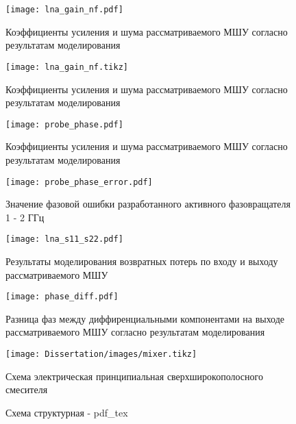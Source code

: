 \begin{figure}[ht]
	\centering
	\texttt{[image: lna\_gain\_nf.pdf]}
	
	\caption{Коэффициенты усиления и шума рассматриваемого МШУ согласно результатам моделирования}
	\label{ct:lna_gain_nf}
\end{figure}

\begin{figure}[ht]
	\centering
	\texttt{[image: lna\_gain\_nf.tikz]}
	
	\caption{Коэффициенты усиления и шума рассматриваемого МШУ согласно результатам моделирования}
	\label{ct:lna_gain_tikz}
\end{figure}

\begin{figure}[ht]
	\centering
	\texttt{[image: probe\_phase.pdf]}
	
	\caption{Коэффициенты усиления и шума рассматриваемого МШУ согласно результатам моделирования}
	\label{ct:ps_phase}
\end{figure}

\begin{figure}[ht]
	\centering
	\texttt{[image: probe\_phase\_error.pdf]}
	
	\caption{Значение фазовой ошибки разработанного активного фазовращателя 1 - 2 ГГц}
	\label{ct:ps_phase_error}
\end{figure}

\begin{figure}[ht]
	\centering
	\texttt{[image: lna\_s11\_s22.pdf]}
	
	\caption{Результаты моделирования возвратных потерь по входу и выходу рассматриваемого МШУ}
	\label{ct:lna_s11_s22}
\end{figure}

\begin{figure}[ht]
	\centering
	\texttt{[image: phase\_diff.pdf]}
	
	\caption{Разница фаз между диффиренциальными компонентами на выходе рассматриваемого МШУ согласно результатам моделирования}
	\label{ct:phase_diff}
\end{figure}

\begin{figure}[ht]
	\centering
	\texttt{[image: Dissertation/images/mixer.tikz]}
	
	\caption{Схема электрическая принципиальная сверхширокополосного смесителя}
	\label{ct:mixer_1_18}
\end{figure}

\begin{figure}[ht]
	\centering
	\resizebox{\linewidth}{!}{}
	
	\caption{Схема структурная - pdf\_tex}
	\label{ct:drawing}
\end{figure}

